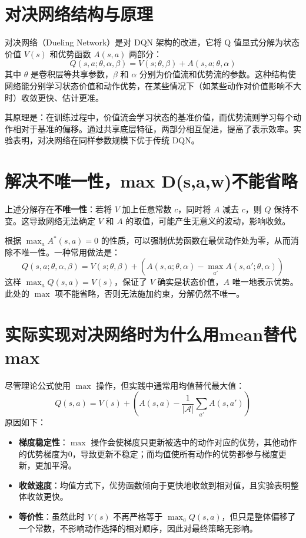 \documentclass{article}
\begin{document}
\section{对决网络结构与原理}
对决网络（Dueling Network）是对 DQN 架构的改进，它将 Q 值显式分解为状态价值 $V(s)$ 和优势函数 $A(s,a)$ 两部分：
\[
Q(s,a; \theta, \alpha, \beta) = V(s; \theta, \beta) + A(s,a; \theta, \alpha)
\tag{25}
\]
其中 $\theta$ 是卷积层等共享参数，$\beta$ 和 $\alpha$ 分别为价值流和优势流的参数。这种结构使网络能分别学习状态价值和动作优势，在某些情况下（如某些动作对价值影响不大时）收敛更快、估计更准。

其原理是：在训练过程中，价值流会学习状态的基准价值，而优势流则学习每个动作相对于基准的偏移。通过共享底层特征，两部分相互促进，提高了表示效率。实验表明，对决网络在同样参数规模下优于传统 DQN。

\section{解决不唯一性，max D(s,a,w)不能省略}
上述分解存在\textbf{不唯一性}：若将 $V$ 加上任意常数 $c$，同时将 $A$ 减去 $c$，则 $Q$ 保持不变。这导致网络无法确定 $V$ 和 $A$ 的取值，可能产生无意义的波动，影响收敛。

根据 $\max_a A^*(s,a)=0$ 的性质，可以强制优势函数在最优动作处为零，从而消除不唯一性。一种常用做法是：
\[
Q(s,a; \theta, \alpha, \beta) = V(s; \theta, \beta) + \left( A(s,a; \theta, \alpha) - \max_{a'} A(s,a'; \theta, \alpha) \right)
\tag{26}
\]
这样 $\max_a Q(s,a) = V(s)$，保证了 $V$ 确实是状态价值，$A$ 唯一地表示优势。此处的 $\max$ 项不能省略，否则无法施加约束，分解仍然不唯一。

\section{实际实现对决网络时为什么用mean替代max}
尽管理论公式使用 $\max$ 操作，但实践中通常用均值替代最大值：
\[
Q(s,a) = V(s) + \left( A(s,a) - \frac{1}{|\mathcal{A}|} \sum_{a'} A(s,a') \right)
\tag{27}
\]
原因如下：
\begin{itemize}
    \item \textbf{梯度稳定性}：$\max$ 操作会使梯度只更新被选中的动作对应的优势，其他动作的优势梯度为0，导致更新不稳定；而均值使所有动作的优势都参与梯度更新，更加平滑。
    \item \textbf{收敛速度}：均值方式下，优势函数倾向于更快地收敛到相对值，且实验表明整体收敛更快。
    \item \textbf{等价性}：虽然此时 $V(s)$ 不再严格等于 $\max_a Q(s,a)$，但只是整体偏移了一个常数，不影响动作选择的相对顺序，因此对最终策略无影响。
\end{itemize}
\end{document}
